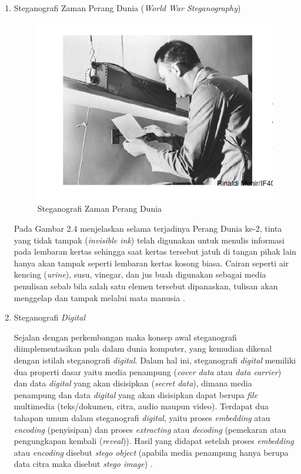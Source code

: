\begin{enumerate}
		\item Steganografi Zaman Perang Dunia (\emph{World War Steganography})
		
		\begin{figure}[H]
			\centering
			\includegraphics[width=1\textwidth]{gambar/steganografi_perangdunia}
			\caption{Steganografi Zaman Perang Dunia}
			\label{steganografi_perangdunia}
		\end{figure}
	
		Pada Gambar 2.4 menjelaskan selama terjadinya Perang Dunia ke-2, tinta yang tidak tampak (\emph{invisible ink}) telah digunakan untuk menulis informasi pada lembaran kertas sehingga saat kertas tersebut jatuh di tangan pihak lain hanya akan tampak seperti lembaran kertas kosong biasa. Cairan seperti air kencing (\emph{urine}), susu, vinegar, dan jus buah digunakan sebagai media penulisan sebab bila salah satu elemen tersebut dipanaskan, tulisan akan menggelap dan tampak melalui mata manusia \cite{munir}.
		
		\item Steganografi \emph{Digital}
		
		Sejalan dengan perkembangan maka konsep awal steganografi diimplementasikan pula dalam dunia komputer, yang kemudian dikenal dengan istilah steganografi \emph{digital}. Dalam hal ini, steganografi \emph{digital} memiliki dua properti dasar yaitu media penampung (\emph{cover data} atau \emph{data carrier}) dan data \emph{digital} yang akan disisipkan (\emph{secret data}), dimana media penampung dan data \emph{digital} yang akan disisipkan dapat berupa \emph{file} multimedia (teks/dokumen, citra, audio maupun video). Terdapat dua tahapan umum dalam steganografi \emph{digital}, yaitu proses \emph{embedding} atau \emph{encoding} (penyisipan) dan proses \emph{extracting} atau \emph{decoding} (pemekaran atau pengungkapan kembali (\emph{reveal})). Hasil yang didapat setelah proses \emph{embedding} atau \emph{encoding} disebut \emph{stego object} (apabila media penampung hanya berupa data citra maka disebut \emph{stego image}) \cite{prayudi}.
	\end{enumerate}

